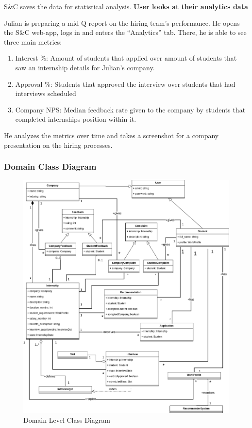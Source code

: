 S\&C saves the data for statistical analysis.
\textbf{User looks at their analytics data}

Julian is preparing a mid-Q report on the hiring team’s performance. He opens the S\&C web-app, logs in and enters the “Analytics” tab. There, he is able to see three main metrics:

\begin{enumerate}
    \item Interest \%: Amount of students that applied over amount of students that saw an internship details for Julian’s company.
    \item Approval \%: Students that approved the interview over students that had interviews scheduled
    \item  Company NPS: Median feedback rate given to the company by students that completed internships position within it.
\end{enumerate}

He analyzes the metrics over time and takes a screenshot for a company presentation on the hiring processes.
\clearpage
\subsubsection{Domain Class Diagram}
\begin{figure}[H]
\centering
\includegraphics[scale=0.45]{Images/class-diagram.png}
\caption{\label{fig:class-diagram} Domain Level Class Diagram}
\end{figure}

